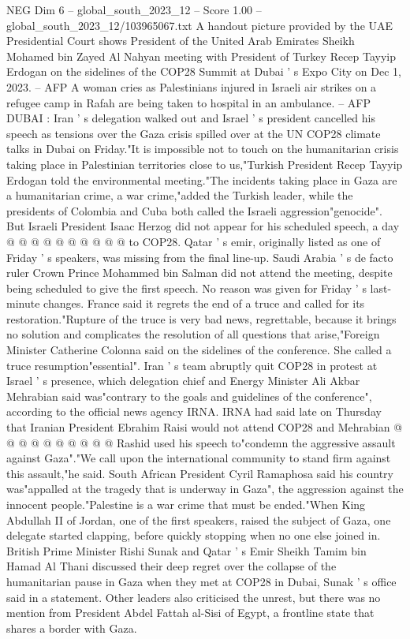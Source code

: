 \begin{textsample}{NEG Dim 6 – global\_south\_2023\_12 – Score 1.00 – global\_south\_2023\_12/103965067.txt}  \label{ex:f6_neg_321}
A handout picture provided by the UAE Presidential Court shows President of the United Arab Emirates Sheikh Mohamed bin Zayed Al Nahyan meeting with President of Turkey Recep Tayyip Erdogan on the sidelines of the COP28 Summit at Dubai ' s Expo City on Dec 1, 2023. -- AFP A woman cries as Palestinians injured in Israeli air strikes on a refugee camp in Rafah are being taken to hospital in an ambulance. -- AFP DUBAI : Iran ' s delegation walked out and Israel ' s president cancelled his speech as tensions over the Gaza crisis spilled over at the UN COP28 climate talks in Dubai on Friday."It is impossible not to touch on the humanitarian crisis taking place in Palestinian territories close to us,"Turkish President Recep Tayyip Erdogan told the environmental meeting."The incidents taking place in Gaza are a humanitarian crime, a war crime,"added the Turkish leader, while the presidents of Colombia and Cuba both called the Israeli aggression"genocide".
But Israeli President Isaac Herzog did not appear for his scheduled speech, a day @ @ @ @ @ @ @ @ @ @ to COP28.
Qatar ' s emir, originally listed as one of Friday ' s speakers, was missing from the final line-up.
Saudi Arabia ' s de facto ruler Crown Prince Mohammed bin Salman did not attend the meeting, despite being scheduled to give the first speech.
No reason was given for Friday ' s last-minute changes.
France said it regrets the end of a truce and called for its restoration."Rupture of the truce is very bad news, regrettable, because it brings no solution and complicates the resolution of all questions that arise,"Foreign Minister Catherine Colonna said on the sidelines of the conference.
She called a truce resumption"essential".
Iran ' s team abruptly quit COP28 in protest at Israel ' s presence, which delegation chief and Energy Minister Ali Akbar Mehrabian said was"contrary to the goals and guidelines of the conference", according to the official news agency IRNA.
IRNA had said late on Thursday that Iranian President Ebrahim Raisi would not attend COP28 and Mehrabian @ @ @ @ @ @ @ @ @ @ Rashid used his speech to"condemn the aggressive assault against Gaza"."We call upon the international community to stand firm against this assault,"he said.
South African President Cyril Ramaphosa said his country was"appalled at the tragedy that is underway in Gaza", the aggression against the innocent people."Palestine is a war crime that must be ended."When King Abdullah II of Jordan, one of the first speakers, raised the subject of Gaza, one delegate started clapping, before quickly stopping when no one else joined in.
British Prime Minister Rishi Sunak and Qatar ' s Emir Sheikh Tamim bin Hamad Al Thani discussed their deep regret over the collapse of the humanitarian pause in Gaza when they met at COP28 in Dubai, Sunak ' s office said in a statement.
Other leaders also criticised the unrest, but there was no mention from President Abdel Fattah al-Sisi of Egypt, a frontline state that shares a border with Gaza.

\end{textsample}
